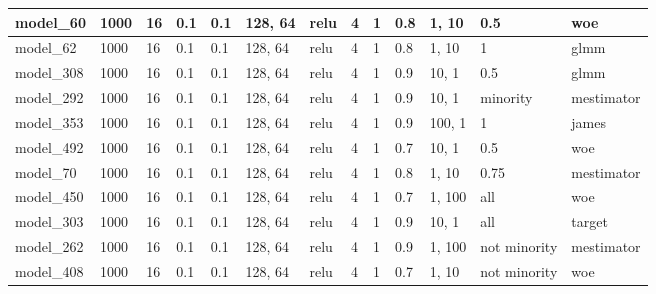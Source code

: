 \begin{tabular}{|l|l|l|l|l|l|l|l|l|l|l|l|l|}
model\_60      & 1000           & 16           & 0.1          & 0.1          & 128, 64     & relu         & 4           & 1            & 0.8               & 1, 10            & 0.5                         & woe               \\ \hline
model\_62      & 1000           & 16           & 0.1          & 0.1          & 128, 64     & relu         & 4           & 1            & 0.8               & 1, 10            & 1                           & glmm              \\ \hline
model\_308     & 1000           & 16           & 0.1          & 0.1          & 128, 64     & relu         & 4           & 1            & 0.9               & 10, 1            & 0.5                         & glmm              \\ \hline
model\_292     & 1000           & 16           & 0.1          & 0.1          & 128, 64     & relu         & 4           & 1            & 0.9               & 10, 1            & minority                    & mestimator        \\ \hline
model\_353     & 1000           & 16           & 0.1          & 0.1          & 128, 64     & relu         & 4           & 1            & 0.9               & 100, 1           & 1                           & james             \\ \hline
model\_492     & 1000           & 16           & 0.1          & 0.1          & 128, 64     & relu         & 4           & 1            & 0.7               & 10, 1            & 0.5                         & woe               \\ \hline
model\_70      & 1000           & 16           & 0.1          & 0.1          & 128, 64     & relu         & 4           & 1            & 0.8               & 1, 10            & 0.75                        & mestimator        \\ \hline
model\_450     & 1000           & 16           & 0.1          & 0.1          & 128, 64     & relu         & 4           & 1            & 0.7               & 1, 100           & all                         & woe               \\ \hline
model\_303     & 1000           & 16           & 0.1          & 0.1          & 128, 64     & relu         & 4           & 1            & 0.9               & 10, 1            & all                         & target            \\ \hline
model\_262     & 1000           & 16           & 0.1          & 0.1          & 128, 64     & relu         & 4           & 1            & 0.9               & 1, 100           & not minority                & mestimator        \\ \hline
model\_408     & 1000           & 16           & 0.1          & 0.1          & 128, 64     & relu         & 4           & 1            & 0.7               & 1, 10            & not minority                & woe               \\ \hline
\end{tabular}